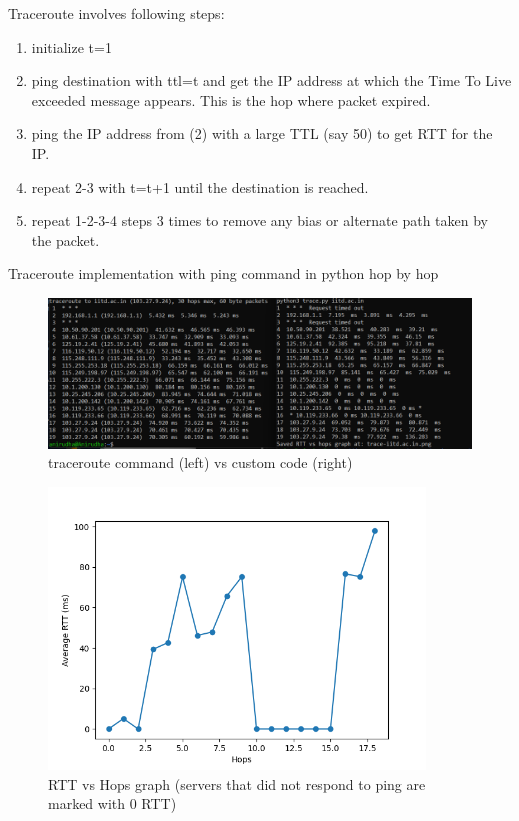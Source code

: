 \documentclass[]{assignment}
\begin{document}
Traceroute involves following steps:

\begin{enumerate}
    \item initialize t=1
    \item ping destination with ttl=t and get the IP address at which the Time To Live exceeded message appears. This is the hop where packet expired.
    \item ping the IP address from (2) with a large TTL (say 50) to get RTT for the IP.
    \item repeat 2-3 with t=t+1 until the destination is reached.
    \item repeat 1-2-3-4 steps 3 times to remove any bias or alternate path taken by the packet.
 \end{enumerate}
    Traceroute implementation with ping command in python hop by hop
        \begin{figure}[hbt!]
    \centering
    \includegraphics[width=18cm]{assignment-1/report/graph.png}
    \caption{traceroute command (left) vs custom code (right)}
    \label{fig:galaxy}
    \end{figure}
        \begin{figure}[hbt!]
    \centering
    \includegraphics[width=10cm]{assignment-1/report/trace-iitd.ac.in.png}
    \caption{RTT vs Hops graph (servers that did not respond to ping are marked with 0 RTT)}
    \label{fig:galaxy}
    \end{figure}
\end{document}
